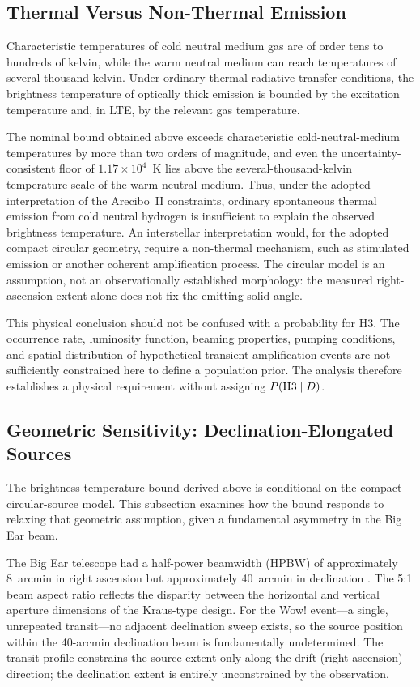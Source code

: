 \documentclass[twocolumn]{aastex701}
\begin{document}
\subsection{Thermal Versus Non-Thermal Emission}

Characteristic temperatures of cold neutral medium gas are of order tens to hundreds of kelvin, while the warm neutral medium can reach temperatures of several thousand kelvin. Under ordinary thermal radiative-transfer conditions, the brightness temperature of optically thick emission is bounded by the excitation temperature and, in LTE, by the relevant gas temperature.

The nominal bound obtained above exceeds characteristic cold-neutral-medium temperatures by more than two orders of magnitude, and even the uncertainty-consistent floor of $1.17\times10^4$~K lies above the several-thousand-kelvin temperature scale of the warm neutral medium. Thus, under the adopted interpretation of the Arecibo~II constraints, ordinary spontaneous thermal emission from cold neutral hydrogen is insufficient to explain the observed brightness temperature. An interstellar  interpretation would, for the adopted compact circular geometry, require a non-thermal mechanism, such as stimulated emission or another coherent amplification process. The circular model is an assumption, not an observationally established morphology: the measured right-ascension extent alone does not fix the emitting solid angle.

This physical conclusion should not be confused with a probability for H3. The occurrence rate, luminosity function, beaming properties, pumping conditions, and spatial distribution of hypothetical transient  amplification events are not sufficiently constrained here to define a population prior. The analysis therefore establishes a physical requirement without assigning $P({\rm H3}\mid D)$.

\subsection{Geometric Sensitivity: Declination-Elongated Sources}
\label{sec:h3_geometry}

The brightness-temperature bound derived above is conditional on the compact circular-source model. This subsection examines how the bound responds to relaxing that geometric assumption, given a fundamental asymmetry in the Big Ear beam.

The Big Ear telescope had a half-power beamwidth (HPBW) of approximately 8~arcmin in right ascension but approximately 40~arcmin in declination \citep{ehman1997,mendez2024}. The 5:1 beam aspect ratio reflects the disparity between the horizontal and vertical aperture dimensions of the Kraus-type design. For the Wow! event---a single, unrepeated transit---no adjacent declination sweep exists, so the source position within the 40-arcmin declination beam is fundamentally undetermined. The transit profile constrains the source extent only along the drift (right-ascension) direction; the declination extent is entirely unconstrained by the observation.
\end{document}
